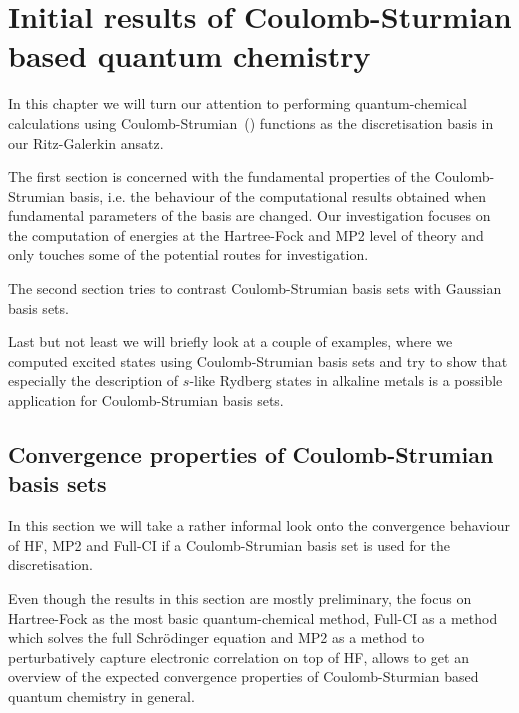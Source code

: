 \chapter[Coulomb-Sturmian based quantum chemistry]%
{Initial results of Coulomb-Sturmian based quantum chemistry}
\label{CSQChem}

In this chapter we will turn our attention to performing
quantum-chemical calculations using Coulomb-Strumian~(\CS) functions
as the discretisation basis in our Ritz-Galerkin ansatz.

The first section is concerned with the fundamental properties
of the Coulomb-Strumian basis,
i.e. the behaviour of the computational results obtained
when fundamental parameters of the basis are changed.
Our investigation focuses on the computation
of energies at the Hartree-Fock and MP2 level of theory
and only touches some of the potential routes for investigation.

The second section tries to contrast Coulomb-Strumian basis sets
with Gaussian basis sets.

Last but not least we will briefly look at a couple of examples,
where we computed excited states using Coulomb-Strumian basis sets
and try to show that especially the description of $s$-like
Rydberg states in alkaline metals is a possible application
for Coulomb-Strumian basis sets.


\section{Convergence properties of Coulomb-Strumian basis sets}
In this section we will take a rather informal look
onto the convergence behaviour of HF, MP2 and Full-CI
if a Coulomb-Strumian basis set is used for the discretisation.

Even though the results in this section are mostly
preliminary,
the focus on Hartree-Fock as the most basic quantum-chemical method,
Full-CI as a method which solves the full Schrödinger equation
and MP2 as a method to perturbatively capture electronic correlation
on top of HF,
allows to get an overview of the expected convergence properties
of Coulomb-Sturmian based quantum chemistry in general.

